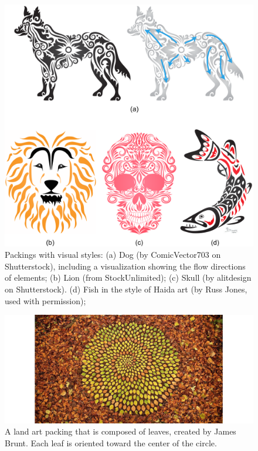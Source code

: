 \begin{figure}
\centering
\includegraphics[width=1.0\textwidth]{figures/intro/dog_ornament_flow.pdf} 
\caption[Packings with flow visual styles]
{\label{fig_dog_flow} 
\newtext
{
Packings with  visual styles:}
(a) Dog (by ComicVector703 on Shutterstock), 
including a visualization showing the flow directions of elements; 
(b) Lion (from StockUnlimited);  
(c) Skull (by alitdesign on Shutterstock).
(d) Fish in the style of Haida art (by Russ Jones, used with permission); 
 }
\end{figure}



\begin{figure}
\centering
\includegraphics[width=1.0\textwidth]{figures/intro/woodland.jpg} 
\caption[A land art packing]
{\label{fig_woodland} 
\newtext
{
A land art packing that is composed of leaves, created by James Brunt. 
Each leaf is oriented toward the center of the circle.
}
 }
\end{figure}

